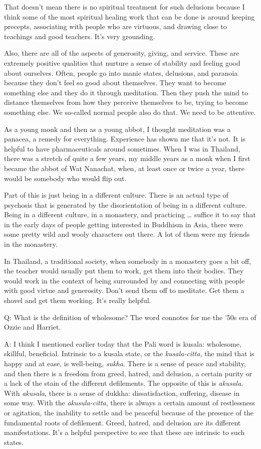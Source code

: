 That doesn’t mean there is no spiritual treatment for such delusions
because I think some of the most spiritual healing work that can be done
is around keeping precepts, associating with people who are virtuous,
and drawing close to teachings and good teachers. It’s very grounding.

Also, there are all of the aspects of generosity, giving, and service.
These are extremely positive qualities that nurture a sense of stability
and feeling good about ourselves. Often, people go into manic states,
delusions, and paranoia because they don’t feel so good about
themselves. They want to become something else and they do it through
meditation. Then they push the mind to distance themselves from how they
perceive themselves to be, trying to become something else. We so-called
normal people also do that. We need to be attentive.

As a young monk and then as a young abbot, I thought meditation was a
panacea, a remedy for everything. Experience has shown me that it’s not.
It is helpful to have pharmaceuticals around sometimes. When I was in
Thailand, there was a stretch of quite a few years, my middle years as a
monk when I first became the abbot of Wat Nanachat, when, at least once
or twice a year, there would be somebody who would flip out.

Part of this is just being in a different culture. There is an actual
type of psychosis that is generated by the disorientation of being in a
different culture. Being in a different culture, in a monastery, and
practicing \ldots{} suffice it to say that in the early days of people
getting interested in Buddhism in Asia, there were some pretty wild and
wooly characters out there. A lot of them were my friends in the
monastery.

In Thailand, a traditional society, when somebody in a monastery goes a
bit off, the teacher would usually put them to work, get them into their
bodies. They would work in the context of being surrounded by and
connecting with people with good virtue and generosity. Don’t send them
off to meditate. Get them a shovel and get them working. It’s really
helpful.

\qaspace
Q: What is the definition of wholesome? The word connotes for me the
’50s era of Ozzie and Harriet.

\qaspace
A: I think I mentioned earlier today that the Pali word is kusala:
wholesome, skillful, beneficial. Intrinsic to a kusala state, or the
\emph{kusala-citta}, the mind that is happy and at ease, is well-being,
\emph{sukha}. There is a sense of peace and stability, and then there is
a freedom from greed, hatred, and delusion, a certain purity or a lack
of the stain of the different defilements. The opposite of this is
\emph{akusala}. With \emph{akusala}, there is a sense of dukkha:
dissatisfaction, suffering, disease in some way. With the
\emph{akusula-citta}, there is always a certain amount of restlessness
or agitation, the inability to settle and be peaceful because of the
presence of the fundamental roots of defilement. Greed, hatred, and
delusion are its different manifestations. It’s a helpful perspective to
see that these are intrinsic to such states.

